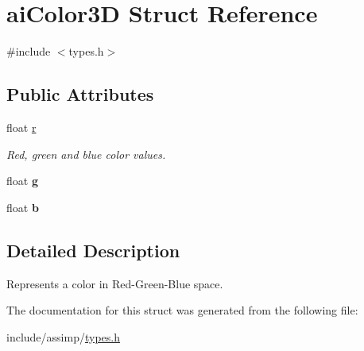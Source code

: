 \hypertarget{structaiColor3D}{\section{ai\-Color3\-D \-Struct \-Reference}
\label{structaiColor3D}
}


{\ttfamily \#include $<$types.\-h$>$}

\subsection*{\-Public \-Attributes}
\begin{DoxyCompactItemize}
\item 
\hypertarget{structaiColor3D_a0ff704458aa26c84bbfe93b2dd89c630}{float \hyperlink{structaiColor3D_a0ff704458aa26c84bbfe93b2dd89c630}{r}}\label{structaiColor3D_a0ff704458aa26c84bbfe93b2dd89c630}

\begin{DoxyCompactList}\small\item\em \-Red, green and blue color values. \end{DoxyCompactList}\item 
\hypertarget{structaiColor3D_a40ecdcee92b5373cbaa5e00ebcdb2cfb}{float {\bfseries g}}\label{structaiColor3D_a40ecdcee92b5373cbaa5e00ebcdb2cfb}

\item 
\hypertarget{structaiColor3D_a02ddcc7af11f7d4d6ea14f1bfb4ef6c7}{float {\bfseries b}}\label{structaiColor3D_a02ddcc7af11f7d4d6ea14f1bfb4ef6c7}

\end{DoxyCompactItemize}


\subsection{\-Detailed \-Description}
\-Represents a color in \-Red-\/\-Green-\/\-Blue space. 

\-The documentation for this struct was generated from the following file\-:\begin{DoxyCompactItemize}
\item 
include/assimp/\hyperlink{types_8h}{types.\-h}\end{DoxyCompactItemize}
